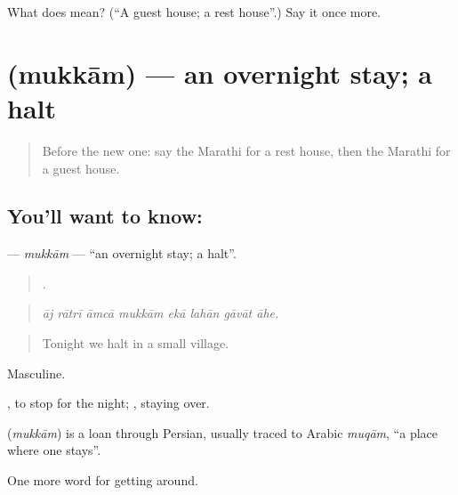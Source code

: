 \begin{tcolorbox}[breakable,colback=teal!4,colframe=teal!35!black,title={Before you move on}]
What does  mean? (\textquotedblleft{}A guest house; a rest house\textquotedblright{}.) Say it once more.
\end{tcolorbox}
\section[\texorpdfstring{\mr{मुक्काम} (mukkām)}{मुक्काम (mukkām)}]{ (mukkām) — an overnight stay; a halt}

\label{lesson:MR-C413-mukkam}



\begin{quote}
Before the new one: say the Marathi for a rest house, then the Marathi for a guest house.
\end{quote}

\subsection*{You'll want to know: }
\textbf{} — \emph{mukkām} — \textquotedblleft{}an overnight stay; a halt\textquotedblright{}.

\begin{quote}
       .
\end{quote}

\begin{quote}
\emph{āj rātrī āmcā mukkām ekā lahān gāvāt āhe.}
\end{quote}

\begin{quote}
Tonight we halt in a small village.
\end{quote}

Masculine.

 , to stop for the night; , staying over.

\begin{cousinweb}
\textbf{} (\emph{mukkām}) is a loan through Persian, usually traced to Arabic \emph{muqām}, \textquotedblleft{}a place where one stays\textquotedblright{}.
\end{cousinweb}

\begin{grammarlens}[title={What you've built}]
One more word for getting around.
\end{grammarlens}

